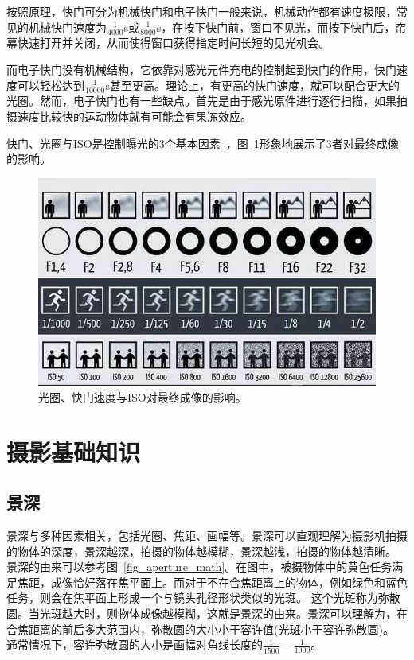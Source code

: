 \documentclass{ctexart}
\begin{document}
按照原理，快门可分为机械快门和电子快门一般来说，机械动作都有速度极限，常见的机械快门速度为$\frac{1}{4000}$s或$\frac{1}{8000}$s，在按下快门前，窗口不见光，而按下快门后，帘幕快速打开并关闭，从而使得窗口获得指定时间长短的见光机会。

而电子快门没有机械结构，它依靠对感光元件充电的控制起到快门的作用，快门速度可以轻松达到$\frac{1}{10000}$s甚至更高。理论上，有更高的快门速度，就可以配合更大的光圈。然而，电子快门也有一些缺点。首先是由于感光原件进行逐行扫描，如果拍摄速度比较快的运动物体就有可能会有果冻效应。

快门、光圈与ISO是控制曝光的3个基本因素~\cite{iso_aperture_shutter}，图~\ref{fig_iso_aperture_shutter}形象地展示了3者对最终成像的影响。

\begin{figure}[h!]
    \centering
    \label{fig_iso_aperture_shutter}
    \includegraphics[width=.7\linewidth]{imgs/iso_aperture_shutter.jpg}
    \caption{光圈、快门速度与ISO对最终成像的影响。}
\end{figure}

\section{摄影基础知识}

\subsection{景深~\cite{depth_of_field}}
景深与多种因素相关，包括光圈、焦距、画幅等。景深可以直观理解为摄影机拍摄的物体的深度，景深越深，拍摄的物体越模糊，景深越浅，拍摄的物体越清晰。
景深的由来可以参考图~\ref{fig_aperture_math}。在图中，被摄物体中的黄色任务满足焦距，成像恰好落在焦平面上。而对于不在合焦距离上的物体，例如绿色和蓝色任务，则会在焦平面上形成一个与镜头孔径形状类似的光斑。
这个光斑称为弥散圆。当光斑越大时，则物体成像越模糊，这就是景深的由来。景深可以理解为，在合焦距离的前后多大范围内，弥散圆的大小小于容许值(光斑小于容许弥散圆)。
通常情况下，容许弥散圆的大小是画幅对角线长度的$\frac{1}{1500} - \frac{1}{1000}$。
\end{document}
